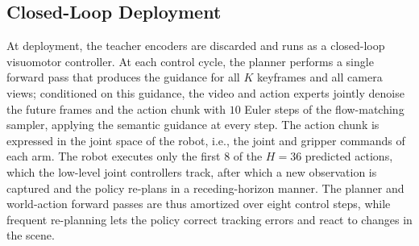 \subsection{Closed-Loop Deployment}
\label{sec:method_deploy}

At deployment, the teacher encoders are discarded and \ourmethod runs as a
closed-loop visuomotor controller.
At each control cycle, the planner performs a single forward pass that produces
the guidance for all $K$ keyframes and all camera views; conditioned on this
guidance, the video and action experts jointly denoise the future frames and the
action chunk with $10$ Euler steps of the flow-matching sampler, applying the
semantic guidance at every step.
The action chunk is expressed in the joint space of the robot, i.e., the
joint and gripper commands of each arm.
The robot executes only the first $8$ of the $H{=}36$ predicted actions, which
the low-level joint controllers track, after which a new observation is captured
and the policy re-plans in a receding-horizon manner.
The planner and world-action forward passes are thus amortized over eight
control steps, while frequent re-planning lets the policy correct tracking
errors and react to changes in the scene.
